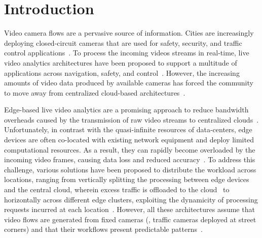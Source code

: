 \section{Introduction}\label{sec:intro}

Video camera flows are a pervasive source of information. Cities are increasingly deploying closed-circuit cameras that are used for safety,
security, and traffic control applications~\cite{parascandola_2018,ratcliffe_2020,grassi2017parkmaster}. To process the incoming videos streams in real-time, live video analytics architectures have been proposed to support a multitude of applications across navigation, safety, and control~\cite{ananthanarayanan2017real,ao2018sprocket,zeng2020distream,jiang2018chameleon,zhang2017live}. However, the increasing amounts of video data produced by available cameras has forced the community to move away from centralized cloud-based architectures~\cite{yi2017lavea,ananthanarayanan2017real}.

Edge-based live video analytics are a promising approach to reduce bandwidth overheads caused by the transmission of raw video streams to centralized clouds~\cite{hu2023edge}. Unfortunately, in contrast with the quasi-infinite resources of data-centers, edge devices are often co-located with existing network equipment and deploy limited computational resources. As a result, they can rapidly become overloaded by the incoming video frames, causing data loss and reduced accuracy~\cite{jiang2018chameleon,jain2020spatula}. To address this challenge, various solutions have been proposed to distribute the workload across locations, ranging from vertically splitting the processing between edge devices and the central cloud, wherein excess traffic is offloaded to the cloud~\cite{hung2018videoedge,chen2015glimpse} to horizontally across different edge clusters, exploiting the dynamicity of processing requests incurred at each location~\cite{jain2020spatula,zhang2019hetero}. However, all these architectures assume that video flows are generated from fixed cameras (\eg, traffic cameras deployed at street corners) and that their workflows present predictable patterns~\cite{jiang2018chameleon}.

